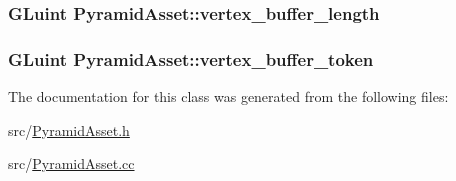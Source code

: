 \subsubsection[{vertex\+\_\+buffer\+\_\+length}]{\setlength{\rightskip}{0pt plus 5cm}G\+Luint Pyramid\+Asset\+::vertex\+\_\+buffer\+\_\+length\hspace{0.3cm}{\ttfamily [private]}}\label{classPyramidAsset_a9252f29d7dc33374d43dd779db4fcce4}
\hypertarget{classPyramidAsset_a54d9cec42bc77d07a66e6c1cd55049b0}{}
\subsubsection[{vertex\+\_\+buffer\+\_\+token}]{\setlength{\rightskip}{0pt plus 5cm}G\+Luint Pyramid\+Asset\+::vertex\+\_\+buffer\+\_\+token\hspace{0.3cm}{\ttfamily [private]}}\label{classPyramidAsset_a54d9cec42bc77d07a66e6c1cd55049b0}


The documentation for this class was generated from the following files\+:\begin{DoxyCompactItemize}
\item 
src/\hyperlink{PyramidAsset_8h}{Pyramid\+Asset.\+h}\item 
src/\hyperlink{PyramidAsset_8cc}{Pyramid\+Asset.\+cc}\end{DoxyCompactItemize}
